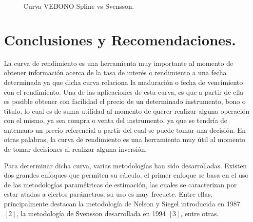 \begin{figure}[h]
\caption{Curva VEBONO Spline vs Svensson.}
\end{figure}

\section{Conclusiones y Recomendaciones.}

\hspace{0.4cm}La curva de rendimiento es una herramienta muy importante al momento de obtener informaci\'on acerca de la tasa de inter\'es o rendimiento a una fecha determinada ya que dicha curva relaciona la maduraci\'on o fecha de vencimiento con el rendimiento. Una de las aplicaciones de esta curva, es que a partir de ella es posible obtener con facilidad el precio de un determinado instrumento, bono o t\'itulo, lo cual es de suma utilidad al momento de querer realizar alguna operaci\'on con el mismo, ya sea compra o venta del instrumento, ya que se tendr\'ia de antemano un precio referencial a partir del cual se puede tomar una decisi\'on. En otras palabras, la curva de rendimiento es una herramienta muy \'util al momento de tomar decisiones al realizar alguna inversi\'on.

\vspace{0.5cm}

\hspace{0.4cm} Para determinar dicha curva, varias metodolog\'ias han sido desarrolladas. Existen dos grandes enfoques que permiten su c\'alculo, el primer enfoque se basa en el uso de las metodolog\'ias param\'etricas de estimaci\'on, las cuales se caracterizan por estar atadas a ciertos par\'ametros, su uso es muy frecuete. Entre ellas, principalmente destacan la metodolog\'ia de Nelson y Siegel introducida en 1987 $[2]$, la metodolog\'ia de Svensson desarrollada en 1994 $[3]$, entre otras.

